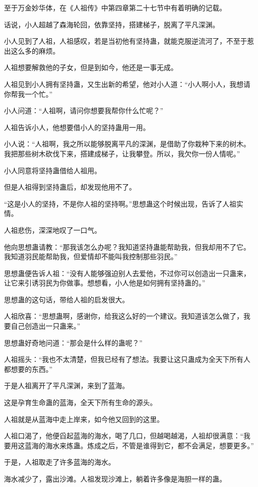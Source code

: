\begin{this_body}
至于万金妙华体，在《人祖传》中第四章第二十七节中有着明确的记载。

话说，小人超越了森海轮回，依靠坚持，搭建梯子，脱离了平凡深渊。

小人见到了人祖，人祖感叹，若是当初他有坚持蛊，就能克服逆流河了，不至于惹出这么多的麻烦。

人祖想要解救他的子女，但是到如今，他还是一事无成。

人祖见到小人拥有坚持蛊，又生出新的希望，他对小人道：“小人啊小人，我想请你帮我一个忙。”

小人问道：“人祖啊，请问你想要我帮你什么忙呢？”

人祖告诉小人，他想要借小人的坚持蛊用一用。

小人说：“人祖啊，我之所以能够脱离平凡的深渊，是借助了你栽种下来的树木。我把那些树木砍伐下来，搭建成梯子，让我攀登。所以，我欠你一份人情呢。”

小人同意将坚持蛊借给人祖用。

但是人祖得到坚持蛊后，却发现他用不了。

“这是小人的坚持，不是你人祖的坚持啊。”思想蛊这个时候出现，告诉了人祖实情。

人祖悲伤，深深地叹了一口气。

他向思想蛊请教：“那我该怎么办呢？我知道坚持蛊能帮助我，但我却用不了它。我知道羽民能帮助我，但爱情却不能叫我控制那些羽民。”

思想蛊便告诉人祖：“没有人能够强迫别人去爱他，不过你可以创造出一只蛊来，让它来引诱羽民为你做事。想想看，小人他是如何拥有坚持蛊的。”

思想蛊的这句话，带给人祖的启发很大。

人祖欣喜：“思想蛊啊，感谢你，给我这么好的一个建议。我知道该怎么做了，我要自己创造出一只蛊来。”

思想蛊好奇地问道：“那会是什么样的蛊呢？”

人祖摇头：“我也不太清楚，但我已经有了想法。我要让这只蛊成为全天下所有人都想要的东西。”

于是人祖离开了平凡深渊，来到了蓝海。

这是孕育生命蛊的蓝海，全天下所有生命的源头。

人祖就是从蓝海中走上岸来，如今他又回到的这里。

人祖口渴了，他便舀起蓝海的海水，喝了几口，但越喝越渴，人祖却很满意：“我要用这蓝海的海水来炼蛊。炼成之后，不管是谁得到它，都不会满足，想要更多。”

于是，人祖取走了许多蓝海的海水。

海水减少了，露出沙滩。人祖发现沙滩上，躺着许多像是海胆一样的蛊。


\end{this_body}
